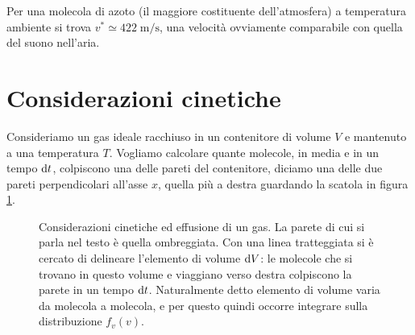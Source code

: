 Per una molecola di azoto (il maggiore costituente dell'atmosfera) a temperatura ambiente si trova $v^{*} \simeq 422\;\mbox{m/s}$, una velocità ovviamente comparabile con quella del suono nell'aria.

\section{Considerazioni cinetiche}
\label{sec:04-conskin}

Consideriamo un gas ideale racchiuso in un contenitore di volume $V$ e mantenuto a una temperatura $T$. Vogliamo calcolare quante molecole, in media e in un tempo ${\textrm d}t$, colpiscono una delle pareti del contenitore, diciamo una delle due pareti perpendicolari all'asse $x$, quella più a destra guardando la scatola in figura \ref{fig:04-effusione}.
\begin{figure}[h!b]
  \centering
  
  \caption{Considerazioni cinetiche ed effusione di un gas. La parete di cui si parla nel testo è quella ombreggiata. Con una linea tratteggiata si è cercato di delineare l'elemento di volume ${\textrm d}V$: le molecole che si trovano in questo volume e viaggiano verso destra colpiscono la parete in un tempo ${\textrm d}t$. Naturalmente detto elemento di volume varia da molecola a molecola, e per questo quindi occorre integrare sulla distribuzione $f_v(v)$.}
  \label{fig:04-effusione}
\end{figure}

